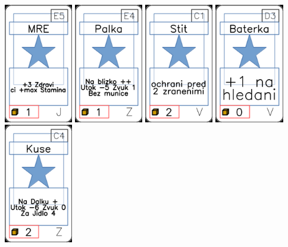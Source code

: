 \documentclass[a4paper]{article}
\begin{document}
	\includegraphics[width=3.0cm]{img-1_24}
	\includegraphics[width=3.0cm]{img-1_83}
	\includegraphics[width=3.0cm]{img-1_70}
	\includegraphics[width=3.0cm]{img-1_77}
	\includegraphics[width=3.0cm]{img-1_103}
\end{document}
